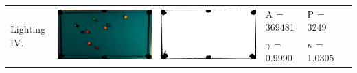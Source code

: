 \begin{tabular}{|l|c|c|l|l|c|}
\multirow{2}{*}{Lighting IV.} & \multirow{2}{*}{\includegraphics[scale=0.05]{../images/1/9_img.png}} & \multirow{2}{*}{\includegraphics[scale=0.05]{../images/1/9_mask.png}} & A = 369481 & P = 3249 & \multirow{2}{*}{}\\ 
& & & $\gamma$ = 0.9990 & $\kappa$ = 1.0305 & \\
\hline


\end{tabular}
